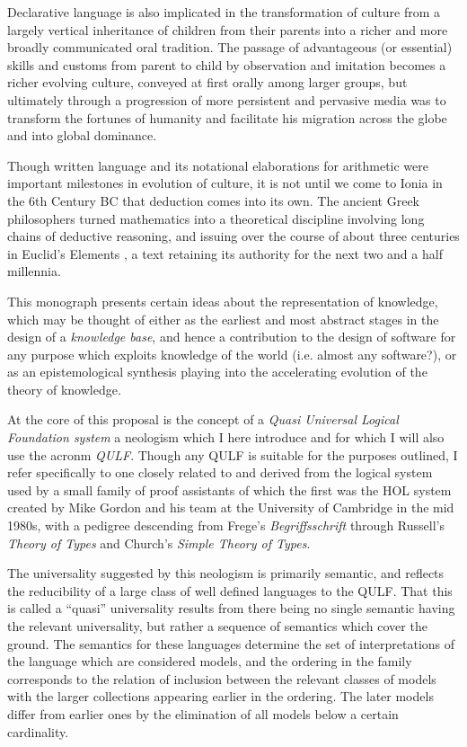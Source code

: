 \documentclass[10pt,titlepage]{book}
\begin{document}
Declarative language is also implicated in the transformation of culture from a largely vertical inheritance of children from their parents into a richer and more broadly communicated oral tradition.
The passage of advantageous (or essential) skills and customs from parent to child by observation and imitation becomes a richer evolving culture, conveyed at first orally among larger groups, but ultimately through a progression of more persistent and pervasive media was to transform the fortunes of humanity and facilitate his migration across the globe and into global dominance.

Though written language and its notational elaborations for arithmetic were important milestones in evolution of culture, it is not until we come to Ionia in the 6th Century BC that deduction comes into its own.
The ancient Greek philosophers turned mathematics into a theoretical discipline involving long chains of deductive reasoning, and issuing over the course of about three centuries in Euclid's Elements \cite{euclidEL1}, a text retaining its authority for the next two and a half millennia. 


This monograph presents certain ideas about the representation of knowledge, which may be thought of either as the earliest and most abstract stages in the design of a \emph{knowledge base}, and hence a contribution to the design of software for any purpose which exploits knowledge of the world (i.e. almost any software?), or as an epistemological synthesis playing into the accelerating evolution of the theory of knowledge.

At the core of this proposal is the concept of a \emph{Quasi Universal Logical Foundation system} a neologism which I here introduce and for which I will also use the acronm \emph{QULF}.
Though any QULF is suitable for the purposes outlined, I refer specifically to one closely related to and derived from the logical system used by a small family of proof assistants of which the first was the HOL system created by Mike Gordon and his team at the University of Cambridge in the mid 1980s, with a pedigree descending from Frege's \emph{Begriffsschrift}\cite{frege79} through Russell's \emph{Theory of Types}\cite{russell1908} and Church's \emph{Simple Theory of Types}\cite{churchSTT}.

The universality suggested by this neologism is primarily semantic, and reflects the reducibility of a large class of well defined languages to the QULF.
That this is called a ``quasi'' universality results from there being no single semantic having the relevant universality, but rather a sequence of semantics which cover the ground.
The semantics for these languages determine the set of interpretations of the language which are considered models, and the ordering in the family corresponds to the relation of inclusion between the relevant classes of models with the larger collections appearing earlier in the ordering.
The later models differ from earlier ones by the elimination of all models below a certain cardinality.
\end{document}
